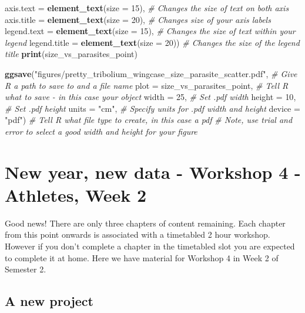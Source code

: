 \documentclass[
]{book}
\newenvironment{Shaded}{\begin{snugshade}}{\end{snugshade}}
\newcommand{\AttributeTok}[1]{\textcolor[rgb]{0.13,0.29,0.53}{#1}}
\newcommand{\CommentTok}[1]{\textcolor[rgb]{0.56,0.35,0.01}{\textit{#1}}}
\newcommand{\DecValTok}[1]{\textcolor[rgb]{0.00,0.00,0.81}{#1}}
\newcommand{\FunctionTok}[1]{\textcolor[rgb]{0.13,0.29,0.53}{\textbf{#1}}}
\newcommand{\NormalTok}[1]{#1}
\newcommand{\StringTok}[1]{\textcolor[rgb]{0.31,0.60,0.02}{#1}}
\begin{document}
\begin{Shaded}
\begin{Highlighting}[]
        \AttributeTok{axis.text =} \FunctionTok{element\_text}\NormalTok{(}\AttributeTok{size =} \DecValTok{15}\NormalTok{), }\CommentTok{\# Changes the size of text on both axis }
        \AttributeTok{axis.title =} \FunctionTok{element\_text}\NormalTok{(}\AttributeTok{size =} \DecValTok{20}\NormalTok{), }\CommentTok{\# Changes size of your axis labels }
        \AttributeTok{legend.text =} \FunctionTok{element\_text}\NormalTok{(}\AttributeTok{size =} \DecValTok{15}\NormalTok{), }\CommentTok{\# Changes the size of text within your legend}
        \AttributeTok{legend.title =} \FunctionTok{element\_text}\NormalTok{(}\AttributeTok{size =} \DecValTok{20}\NormalTok{)) }\CommentTok{\# Changes the size of the legend title  }
\FunctionTok{print}\NormalTok{(size\_vs\_parasites\_point)}

\FunctionTok{ggsave}\NormalTok{(}\StringTok{"figures/pretty\_tribolium\_wingcase\_size\_parasite\_scatter.pdf"}\NormalTok{, }\CommentTok{\# Give R a path to save to and a file name}
       \AttributeTok{plot =}\NormalTok{ size\_vs\_parasites\_point, }\CommentTok{\# Tell R what to save {-} in this case your object}
       \AttributeTok{width =} \DecValTok{25}\NormalTok{, }\CommentTok{\# Set .pdf width}
       \AttributeTok{height =} \DecValTok{10}\NormalTok{, }\CommentTok{\# Set .pdf height}
       \AttributeTok{units =} \StringTok{"cm"}\NormalTok{, }\CommentTok{\# Specify units for .pdf width and height}
       \AttributeTok{device =} \StringTok{"pdf"}\NormalTok{) }\CommentTok{\# Tell R what file type to create, in this case a pdf}
\CommentTok{\# Note, use trial and error to select a good width and height for your figure}
\end{Highlighting}
\end{Shaded}

\chapter{New year, new data - Workshop 4 - Athletes, Week 2}\label{data-setup}

Good news! There are only three chapters of content remaining. Each chapter from this point onwards is associated with a timetabled 2 hour workshop. However if you don't complete a chapter in the timetabled slot you are expected to complete it at home. Here we have material for Workshop 4 in Week 2 of Semester 2.

\section{A new project}\label{a-new-project}
\end{document}

